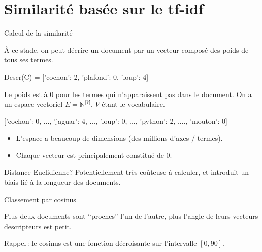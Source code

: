 \section{Similarité basée sur le tf-idf}


\begin{frame}{Calcul de la similarité}

À ce stade, on peut \alert{décrire} un document par un \alert{vecteur} composé
des \alert{poids} de tous ses termes. 

\medskip

\begin{center}
Descr(C) = ['cochon': 2, 'plafond': 0, 'loup': 4]
\end{center}

\vfill

Le poids est à 0 pour les termes qui n'apparaissent pas dans le document. On a un 
espace vectoriel $E = \mathbb{N}^{|V|}$, $V$ étant le vocabulaire.

\medskip
\begin{center}
['cochon': 0,  ..., 'jaguar': 4, ..., 'loup': 0, ..., 'python': 2, ...., 'mouton': 0]
\end{center}

\begin{itemize}
  \item L'espace a \alert{beaucoup} de dimensions (des millions d'axes / termes). 
   \item Chaque vecteur 
est principalement constitué de 0.
\end{itemize}

\begin{noteblock}{Distance Euclidienne?}
Potentiellement très coûteuse à calculer, et introduit un biais lié à la longueur
des documents. 
\end{noteblock}
\end{frame}


\begin{frame}{Classement par cosinus}

Plus deux documents sont ``proches'' l'un de l'autre, plus l'angle de leurs vecteurs descripteurs est petit. 

\vfill

 



\alert{Rappel}\,: le cosinus est une fonction décroisante sur l'intervalle $[0, 90]$.

\end{frame}


